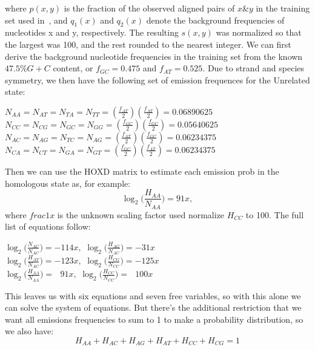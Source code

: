 \documentclass{ws-procs9x6}
\begin{document}
where $p(x,y)$ is the fraction of the observed aligned pairs of $x\&y$ in the training set used in~\cite{hoxd}, and $q_{1}(x)$ and $q_{2}(x)$ denote the background frequencies of nucleotides x and y, respectively. The resulting $s(x,y)$ was normalized so that the largest was 100, and the rest rounded to the nearest integer. We can first derive the background nucleotide frequencies in the training set from the known $47.5\%G+C$ content, or $f_{GC}=0.475$ and $f_{AT}=0.525$. Due to strand and species symmetry, we then have the following set of emission frequences for the Unrelated state: \begin{center}$N_{AA}=N_{AT}=N_{TA}=N_{TT}=(\frac{f_{AT}}{2})(\frac{f_{AT}}{2}) = 0.06890625$ \\
$N_{CC}=N_{CG}=N_{GC}=N_{GG}=(\frac{f_{GC}}{2})(\frac{f_{GC}}{2}) = 0.05640625$ \\
$N_{AC}=N_{AG}=N_{TC}=N_{AG}=(\frac{f_{AT}}{2})(\frac{f_{GC}}{2}) = 0.06234375$ \\
$N_{CA}=N_{CT}=N_{GA}=N_{GT}=(\frac{f_{GC}}{2})(\frac{f_{AT}}{2}) = 0.06234375$ \\
\end{center}

Then we can use the HOXD matrix to estimate each emission prob in the homologous
state as, for example:
\begin{equation}
\log_{2}\bigg(\frac{H_{AA}}{N_{AA}}\bigg) = 91x,
\end{equation}
where $frac{1}{x}$ is the unknown scaling factor used normalize $H_{CC}$ to 100. The full list of equations follow:
\begin{center}$\log_{2}\bigg(\frac{N_{AC}}{N_{AC}}\bigg) = -114x,$
$\log_{2}\bigg(\frac{H_{AG}}{N_{AC}}\bigg) = -31x$ \\
$\log_{2}\bigg(\frac{H_{AT}}{N_{AC}}\bigg) = -123x,$
$\log_{2}\bigg(\frac{H_{CG}}{N_{CC}}\bigg) = -125x$ \\
$\log_{2}\bigg(\frac{H_{AA}}{N_{AA}}\bigg) = \ \ \ 91x,$
$\log_{2}\bigg(\frac{H_{CC}}{N_{CC}}\bigg) = \ \ \ 100x$ \\
\end{center}

This leaves us with six equations and seven free variables, so with this alone we can solve the system of equations. But there's the additional restriction that we want all emissions frequencies to sum to 1 to make a probability distribution, so we also have:
\begin{equation}
H_{AA} + H_{AC} + H_{AG} + H_{AT} + H_{CC} + H_{CG} = 1
\end{equation}
\end{document}
